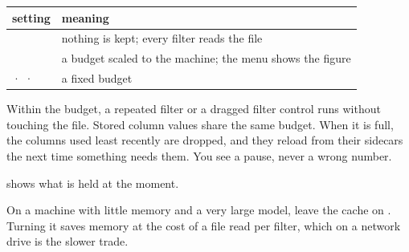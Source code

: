 \begin{tabularx}{\linewidth}{@{}lL@{}}\toprule
setting & meaning \\ \midrule
{} & nothing is kept; every filter reads the file \\
 & a budget scaled to the machine; the menu shows the figure \\
 ·  ·  & a fixed budget \\
\bottomrule
\end{tabularx}

Within the budget, a repeated filter or a dragged filter control runs without touching the file. Stored column values share the same budget. When it is full, the columns used least recently are dropped, and they reload from their sidecars the next time something needs them. You see a pause, never a wrong number.

 shows what is held at the moment.

\begin{tip}
On a machine with little memory and a very large model, leave the cache on . Turning it  saves memory at the cost of a file read per filter, which on a network drive is the slower trade.
\end{tip}
